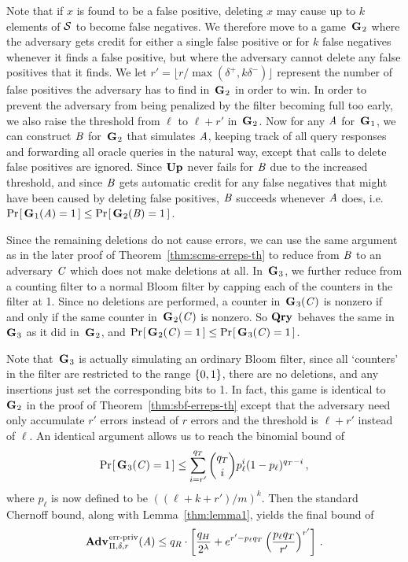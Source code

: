 Note that if $x$ is found to be a
false positive, deleting $x$ may cause up to $k$ elements of $\mathcal{S}$ to become
false negatives. We therefore move to a game~$\textup{\textbf{G}}\hspace{0.5pt}_2$ where the adversary gets
credit for either a single false positive or for $k$ false negatives whenever it
finds a false positive, but where the adversary cannot delete any false
positives that it finds. We let $r' = \lfloor r/\max(\delta^+,k\delta^-)\rfloor$
represent the number of false positives the adversary has to find in~$\textup{\textbf{G}}\hspace{0.5pt}_2$
in order to win. In order to prevent the adversary from being penalized by the
filter becoming full too early, we also raise the threshold from $\ell$ to
$\ell+r'$ in~$\textup{\textbf{G}}\hspace{0.5pt}_2$. Now for any $\mathit{A}$ for~$\textup{\textbf{G}}\hspace{0.5pt}_1$, we can construct
$\mathit{B}$ for~$\textup{\textbf{G}}\hspace{0.5pt}_2$ that simulates $\mathit{A}$, keeping track of all query
responses and forwarding all oracle queries in the natural way, except that
calls to delete false positives are ignored. Since $\textup{\textbf{Up}}\hspace{0.5pt}$ never fails for
$\mathit{B}$ due to the increased threshold, and since $\mathit{B}$ gets automatic credit
for any false negatives that might have been caused by deleting false positives,
$\mathit{B}$ succeeds whenever $\mathit{A}$ does, i.e.
$\Pr\hspace{-1pt}\left[\,\textup{\textbf{G}}\hspace{0.5pt}_1(\mathit{A})=1\,\right] \le \Pr\hspace{-1pt}\left[\,\textup{\textbf{G}}\hspace{0.5pt}_2(\mathit{B}) = 1\,\right]$.

Since the remaining deletions do not cause errors, we can use the same argument
as in the later proof of Theorem~\ref{thm:scms-erreps-th} to reduce from $\mathit{B}$ to an
adversary $\mathit{C}$ which does not make deletions at all. In~$\textup{\textbf{G}}\hspace{0.5pt}_3$, we further
reduce from a counting filter to a normal Bloom filter by capping each of the
counters in the filter at 1. Since no deletions are performed, a counter
in~$\textup{\textbf{G}}\hspace{0.5pt}_3(\mathit{C})$ is nonzero if and only if the same counter
in~$\textup{\textbf{G}}\hspace{0.5pt}_2(\mathit{C})$ is nonzero. So $\textup{\textbf{Qry}}\hspace{0.5pt}$ behaves the same in~$\textup{\textbf{G}}\hspace{0.5pt}_3$ as it
did in~$\textup{\textbf{G}}\hspace{0.5pt}_2$, and $\Pr\hspace{-1pt}\left[\,\textup{\textbf{G}}\hspace{0.5pt}_2(\mathit{C})=1\,\right] \le \Pr\hspace{-1pt}\left[\,\textup{\textbf{G}}\hspace{0.5pt}_3(\mathit{C}) = 1\,\right]$.

Note that~$\textup{\textbf{G}}\hspace{0.5pt}_3$ is actually simulating an ordinary Bloom filter, since all
`counters' in the filter are restricted to the range $\{0,1\}$, there are no
deletions, and any insertions just set the corresponding bits to 1. In fact,
this game is identical to~$\textup{\textbf{G}}\hspace{0.5pt}_2$ in the proof of
Theorem~\ref{thm:sbf-erreps-th} except that the adversary need only accumulate
$r'$ errors instead of $r$ errors and the threshold is $\ell+r'$ instead of
$\ell$. An identical argument allows us to reach the binomial bound of
\begin{equation}
   \Pr\hspace{-1pt}\left[\,\textup{\textbf{G}}\hspace{0.5pt}_3(\mathit{C})=1\,\right] \le
     \sum_{i=r'}^{q_T} \binom{q_T}{i}p_\ell^i(1-p_\ell)^{q_T-i} \,,
\end{equation}
where $p_\ell$ is now defined to be $((\ell+k+r')/m)^k$. Then the standard
Chernoff bound, along with Lemma~\ref{thm:lemma1}, yields the final bound of
\begin{equation}
   \Adv{\erreps}_{\Pi,\delta,r}(\advA) \leq
     q_R \cdot \left[\frac{q_H}{2^\lambda} + e^{r'-p_\ell q_T}\left(\frac{p_\ell
     q_T}{r'}\right)^{r'}\right] \,.
\end{equation}

